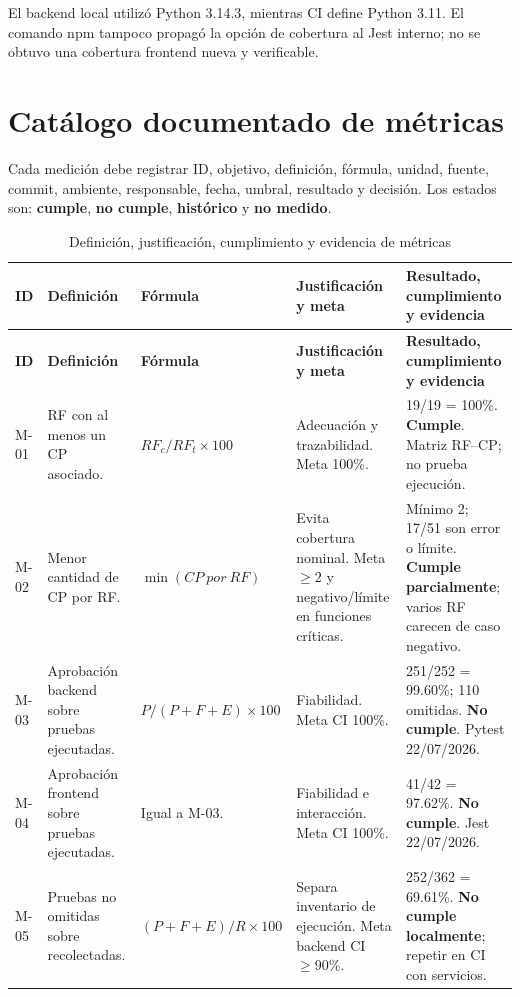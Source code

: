 El backend local utilizó Python 3.14.3, mientras CI define Python 3.11. El comando
npm tampoco propagó la opción de cobertura al Jest interno; no se obtuvo una
cobertura frontend nueva y verificable.

\section{Catálogo documentado de métricas}

Cada medición debe registrar ID, objetivo, definición, fórmula, unidad, fuente,
commit, ambiente, responsable, fecha, umbral, resultado y decisión. Los estados
son: \textbf{cumple}, \textbf{no cumple}, \textbf{histórico} y
\textbf{no medido}.

\begin{landscape}
\small
\begin{longtable}{p{1cm}p{4.2cm}p{3.6cm}p{4.5cm}p{7.5cm}}
\caption{Definición, justificación, cumplimiento y evidencia de métricas}
\label{tab:catalogo-metricas-iso}\\
\toprule
\textbf{ID} & \textbf{Definición} & \textbf{Fórmula} & \textbf{Justificación y meta} & \textbf{Resultado, cumplimiento y evidencia}\\
\midrule
\endfirsthead
\toprule
\textbf{ID} & \textbf{Definición} & \textbf{Fórmula} & \textbf{Justificación y meta} & \textbf{Resultado, cumplimiento y evidencia}\\
\midrule
\endhead
\bottomrule
\endfoot
M-01 & RF con al menos un CP asociado. & $RF_c/RF_t\times100$ & Adecuación y trazabilidad. Meta 100\%. & 19/19 = 100\%. \textbf{Cumple}. Matriz RF--CP; no prueba ejecución.\\
M-02 & Menor cantidad de CP por RF. & $\min(CP\ por\ RF)$ & Evita cobertura nominal. Meta $\geq2$ y negativo/límite en funciones críticas. & Mínimo 2; 17/51 son error o límite. \textbf{Cumple parcialmente}; varios RF carecen de caso negativo.\\
M-03 & Aprobación backend sobre pruebas ejecutadas. & $P/(P+F+E)\times100$ & Fiabilidad. Meta CI 100\%. & 251/252 = 99.60\%; 110 omitidas. \textbf{No cumple}. Pytest 22/07/2026.\\
M-04 & Aprobación frontend sobre pruebas ejecutadas. & Igual a M-03. & Fiabilidad e interacción. Meta CI 100\%. & 41/42 = 97.62\%. \textbf{No cumple}. Jest 22/07/2026.\\
M-05 & Pruebas no omitidas sobre recolectadas. & $(P+F+E)/R\times100$ & Separa inventario de ejecución. Meta backend CI $\geq90$\%. & 252/362 = 69.61\%. \textbf{No cumple localmente}; repetir en CI con servicios.\\

\end{longtable}
\end{landscape}
